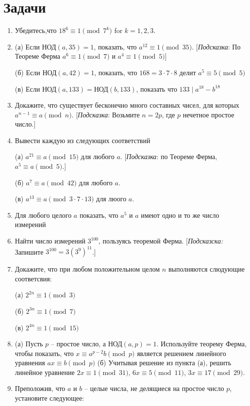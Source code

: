 \documentclass[4apaper,11pt]{article}
\begin{document}
\section{Задачи}
\begin{enumerate}
\item Убедитесь,что $18^6\equiv1\pmod {7^k}$ for $k=1,2,3$.
\item 
(а) Если $\text{НОД}(a,35)=1$, показать, что $a^{12}\equiv1\pmod {35}$. [\textsl{Подсказка}: По Теореме Ферма $a^6\equiv1\pmod7$ и $a^4\equiv1\pmod5$]

(б) Если $\text{НОД}(a,42)=1$, показать, что $168=3\cdot7\cdot8$ делит $a^5\equiv 5\pmod5$  

(в) Если $\text{НОД}(a,133)=\text{НОД}(b,133)$, показать что $133\mid a^{18}-b^{18}$
\item Докажите, что существует бесконечно много составных чисел, для которых $a^{n-1}\equiv a\pmod n$. [\textsl{Подсказка}: Возьмите $n=2p$, где $p$ нечетное простое число.]
\item Вывести каждую из следующих соответствий 

(а) $a^{21}\equiv a\pmod {15}$ для любого $a$. [\textsl{Подсказка}: по Теореме Ферма, $a^5\equiv a \pmod5$.]

(б) $a^7\equiv a\pmod{42}$ для любого $a$.

(в) $a^{13}\equiv a\pmod {3\cdot7\cdot13}$ для люого $a$.
\item Для любого целого $a$ показать, что $a^5$ и $a$ имеют одно и то же число измерений
\item Найти число измерений $3^{100}$, пользуясь теоремой Ферма. [\textsl{Подсказска:} Запишите $3^{100}=3(3^9)^{11}$.]
\item Докажите, что при любом положительном целом $n$ выполняются слюдующие соответсвия:

(а) $2^{2n}\equiv 1\pmod 3$

(б) $2^{3n}\equiv 1\pmod 7$

(в) $2^{4n}\equiv 1\pmod {15}$
\item 
(а) Пусть $p$ -- простое число, а $\text{НОД}(a,p)=1$. Используйте теорему Ферма, чтобы показать, что $x\equiv a^{p-2}b\pmod p$ является решением линейного уравнения $ax\equiv b\pmod p$
(б) Учитывая решение из пункта (а), решить линейное уравнение $2x\equiv 1\pmod {31}$, $6x\equiv 5\pmod {11}$, $3x\equiv 17\pmod {29}$.
\item Преположив, что $a$ и $b$ -- целые числа, не делящиеся на простое число $p$, установите следующее:


\end{enumerate}
\end{document}
